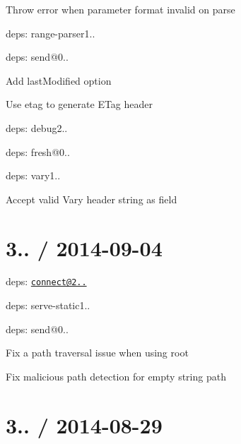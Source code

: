 {\begin{DoxyItemize}
\begin{DoxyItemize}
\item Throw error when parameter format invalid on parse
\end{DoxyItemize}
\item deps\+: range-\/parser1..
\item deps\+: send@0..
\begin{DoxyItemize}
\item Add {\ttfamily last\+Modified} option
\item Use {\ttfamily etag} to generate {\ttfamily E\+Tag} header
\item deps\+: debug2..
\item deps\+: fresh@0..
\end{DoxyItemize}
\item deps\+: vary1..
\begin{DoxyItemize}
\item Accept valid {\ttfamily Vary} header string as {\ttfamily field}
\end{DoxyItemize}
\end{DoxyItemize}}

{\ttfamily \section*{3.. / 2014-\/09-\/04 }}

{\ttfamily }

{\ttfamily 
\begin{DoxyItemize}
\item deps\+: \href{mailto:connect@2.25.10}{\tt connect@2..}
\begin{DoxyItemize}
\item deps\+: serve-\/static1..
\end{DoxyItemize}
\item deps\+: send@0..
\begin{DoxyItemize}
\item Fix a path traversal issue when using {\ttfamily root}
\item Fix malicious path detection for empty string path
\end{DoxyItemize}
\end{DoxyItemize}}

{\ttfamily \section*{3.. / 2014-\/08-\/29 }}


